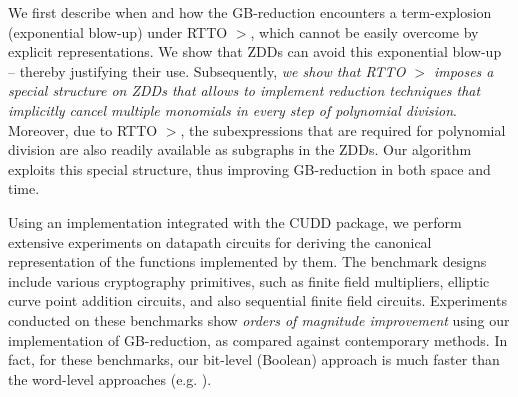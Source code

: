 
We first describe when and how the GB-reduction encounters a
term-explosion (exponential blow-up) under RTTO $>$, which cannot be
easily overcome by explicit representations. We show that ZDDs can
avoid this exponential blow-up -- thereby justifying their use. 
Subsequently, {\it we show that RTTO $>$ imposes 
a special structure on ZDDs that allows to implement reduction
techniques that implicitly cancel multiple   monomials in every step
of polynomial division}. Moreover, due to RTTO $>$,  the
subexpressions that are required for polynomial division are also
readily available as subgraphs in the ZDDs. Our algorithm exploits
this special structure, thus improving GB-reduction in both space and
time. 

Using an implementation integrated with the CUDD \cite{cudd} package,
we perform extensive experiments on datapath circuits for deriving the
canonical representation of the functions implemented by them. The
benchmark designs include various cryptography primitives, such as
finite field multipliers, elliptic curve point addition circuits, and
also  sequential finite field circuits. Experiments conducted on these
benchmarks show {\it orders of magnitude improvement} using our
implementation of GB-reduction, as compared against contemporary
methods. In fact, for these benchmarks, our bit-level (Boolean)
approach is much faster than the word-level approaches
(e.g. \cite{pruss:tcad}). 




